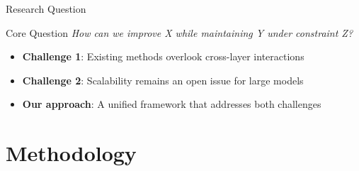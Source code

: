 \documentclass{beamer}
\begin{document}
\begin{frame}{Research Question}
    \begin{block}{Core Question}
        \centering
        \large \textit{How can we improve X while maintaining Y under constraint Z?}
    \end{block}
    \vspace{0.4cm}
    \begin{itemize}
        \setlength{\itemsep}{0.7em}
        \item \textcolor{AccentBlue}{\textbf{Challenge 1}}: Existing methods overlook cross-layer interactions
        \item \textcolor{AccentBlue}{\textbf{Challenge 2}}: Scalability remains an open issue for large models
        \item \textcolor{AccentBlue}{\textbf{Our approach}}: A unified framework that addresses both challenges
    \end{itemize}
\end{frame}

\section[Methodology]{Methodology}
\end{document}
